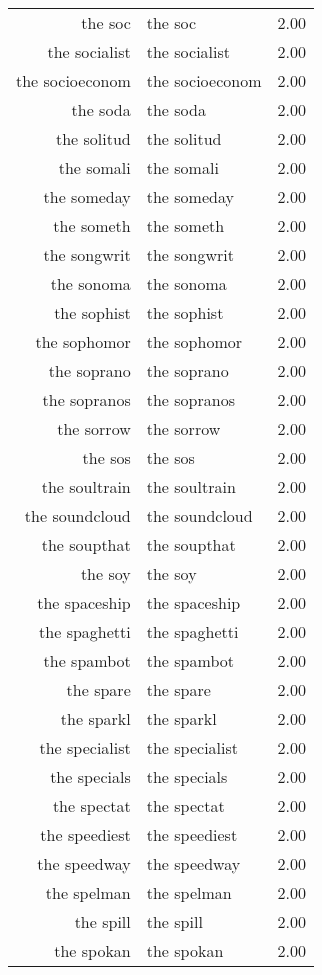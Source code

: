 \begin{table}[ht]
\begin{tabular}{rlr}
  the soc & the soc & 2.00 \\ 
  the socialist & the socialist & 2.00 \\ 
  the socioeconom & the socioeconom & 2.00 \\ 
  the soda & the soda & 2.00 \\ 
  the solitud & the solitud & 2.00 \\ 
  the somali & the somali & 2.00 \\ 
  the someday & the someday & 2.00 \\ 
  the someth & the someth & 2.00 \\ 
  the songwrit & the songwrit & 2.00 \\ 
  the sonoma & the sonoma & 2.00 \\ 
  the sophist & the sophist & 2.00 \\ 
  the sophomor & the sophomor & 2.00 \\ 
  the soprano & the soprano & 2.00 \\ 
  the sopranos & the sopranos & 2.00 \\ 
  the sorrow & the sorrow & 2.00 \\ 
  the sos & the sos & 2.00 \\ 
  the soultrain & the soultrain & 2.00 \\ 
  the soundcloud & the soundcloud & 2.00 \\ 
  the soupthat & the soupthat & 2.00 \\ 
  the soy & the soy & 2.00 \\ 
  the spaceship & the spaceship & 2.00 \\ 
  the spaghetti & the spaghetti & 2.00 \\ 
  the spambot & the spambot & 2.00 \\ 
  the spare & the spare & 2.00 \\ 
  the sparkl & the sparkl & 2.00 \\ 
  the specialist & the specialist & 2.00 \\ 
  the specials & the specials & 2.00 \\ 
  the spectat & the spectat & 2.00 \\ 
  the speediest & the speediest & 2.00 \\ 
  the speedway & the speedway & 2.00 \\ 
  the spelman & the spelman & 2.00 \\ 
  the spill & the spill & 2.00 \\ 
  the spokan & the spokan & 2.00 \\ 

\end{tabular}
\end{table}
